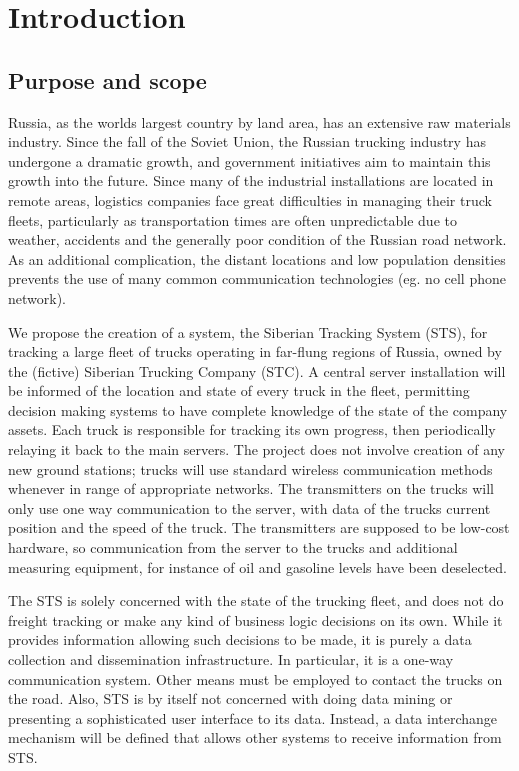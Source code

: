 \documentclass[a4paper,11pt]{report}
\begin{document}
% 
% 
\setcounter{tocdepth}{1}
\tableofcontents

% 
% 
\chapter{Introduction}
\label{cha:introduction}
\thispagestyle{fancy}

\section{Purpose and scope}
\label{sec:purpose-scope}

Russia, as the worlds largest country by land area, has an extensive
raw materials industry.  Since the fall of the Soviet Union, the
Russian trucking industry has undergone a dramatic growth, and
government initiatives aim to maintain this growth into the future.
Since many of the industrial installations are located in remote
areas, logistics companies face great difficulties in managing their
truck fleets, particularly as transportation times are often
unpredictable due to weather, accidents and the generally poor
condition of the Russian road network.  As an additional complication,
the distant locations and low population densities prevents the use of
many common communication technologies (eg. no cell phone network).

We propose the creation of a system, the Siberian Tracking System
(STS), for tracking a large fleet of trucks operating in far-flung
regions of Russia, owned by the (fictive) Siberian Trucking Company
(STC).  A central server installation will be informed of the location
and state of every truck in the fleet, permitting decision making
systems to have complete knowledge of the state of the company assets.
Each truck is responsible for tracking its own progress, then
periodically relaying it back to the main servers.  The project does
not involve creation of any new ground stations; trucks will use
standard wireless communication methods whenever in range of
appropriate networks. The transmitters on the trucks will only use one way communication to the server, with data of the trucks current position and the speed of the truck. The transmitters are supposed to be low-cost hardware, so communication from the server to the trucks and additional measuring equipment, for instance of oil and gasoline levels have been deselected. 

The STS is solely concerned with the state of the trucking fleet, and
does not do freight tracking or make any kind of business logic
decisions on its own.  While it provides information allowing such
decisions to be made, it is purely a data collection and dissemination
infrastructure.  In particular, it is a one-way communication system.
Other means must be employed to contact the trucks on the road.  Also,
STS is by itself not concerned with doing data mining or presenting a
sophisticated user interface to its data.  Instead, a data interchange
mechanism will be defined that allows other systems to receive
information from STS.
\end{document}
